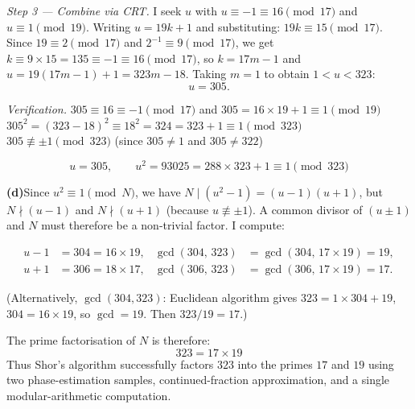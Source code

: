 \documentclass[12pt,a4paper]{article}
\begin{document}
\textit{Step 3 --- Combine via CRT.}
I seek $u$ with $u\equiv-1\equiv16\pmod{17}$ and $u\equiv1\pmod{19}$.
Writing $u=19k+1$ and substituting: $19k\equiv15\pmod{17}$.
Since $19\equiv2\pmod{17}$ and $2^{-1}\equiv9\pmod{17}$, we get $k\equiv9\times15=135\equiv-1\equiv16\pmod{17}$,
so $k=17m-1$ and $u=19(17m-1)+1=323m-18$.
Taking $m=1$ to obtain $1<u<323$:
\[
  u = 305.
\]

\textit{Verification.}
$305\equiv16\equiv-1\pmod{17}$ and $305=16\times19+1\equiv1\pmod{19}$~\checkmark\;
$305^2=(323-18)^2\equiv18^2=324=323+1\equiv1\pmod{323}$~\checkmark\;
$305\not\equiv\pm1\pmod{323}$ (since $305\neq1$ and $305\neq322$)~\checkmark

\[
  \boxed{u=305,\qquad u^2 = 93025 = 288\times323+1\equiv1\pmod{323}}
\]

\medskip
\noindent\textbf{(d)}\enspace Since $u^2\equiv1\pmod{N}$, we have $N\mid(u^2-1)=(u-1)(u+1)$,
but $N\nmid(u-1)$ and $N\nmid(u+1)$ (because $u\not\equiv\pm1$).
A common divisor of $(u\pm1)$ and $N$ must therefore be a non-trivial factor. I compute:

\begin{align*}
u-1 &= 304 = 16\times19, & \gcd(304,\,323) &= \gcd(304,\,17\times19) = 19, \\
u+1 &= 306 = 18\times17, & \gcd(306,\,323) &= \gcd(306,\,17\times19) = 17.
\end{align*}

(Alternatively, $\gcd(304,323)$: Euclidean algorithm gives $323=1\times304+19$, $304=16\times19$,
so $\gcd=19$. Then $323/19=17$.)

The prime factorisation of $N$ is therefore:
\[
  \boxed{323 = 17\times19}
\]
Thus Shor's algorithm successfully factors $323$ into the primes $17$ and $19$ using two phase-estimation
samples, continued-fraction approximation, and a single modular-arithmetic computation.
\end{document}
